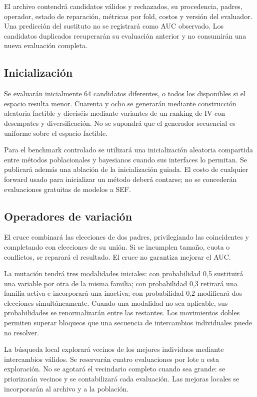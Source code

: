 \documentclass[11pt,letterpaper]{article}
\begin{document}
El archivo contendrá candidatos válidos y rechazados, su procedencia, padres, operador, estado de reparación, métricas por fold, costos y versión del evaluador. Una predicción del sustituto no se registrará como AUC observado. Los candidatos duplicados recuperarán su evaluación anterior y no consumirán una nueva evaluación completa.

\subsection{Inicialización}\label{sec:6.2}

Se evaluarán inicialmente 64 candidatos diferentes, o todos los disponibles si el espacio resulta menor. Cuarenta y ocho se generarán mediante construcción aleatoria factible y dieciséis mediante variantes de un ranking de IV con desempates y diversificación. No se supondrá que el generador secuencial es uniforme sobre el espacio factible.

Para el benchmark controlado se utilizará una inicialización aleatoria compartida entre métodos poblacionales y bayesianos cuando sus interfaces lo permitan. Se publicará además una ablación de la inicialización guiada. El costo de cualquier forward usado para inicializar un método deberá contarse; no se concederán evaluaciones gratuitas de modelos a SEF.

\subsection{Operadores de variación}\label{sec:6.3}

El cruce combinará las elecciones de dos padres, privilegiando las coincidentes y completando con elecciones de su unión. Si se incumplen tamaño, cuota o conflictos, se reparará el resultado. El cruce no garantiza mejorar el AUC.

La mutación tendrá tres modalidades iniciales: con probabilidad 0,5 sustituirá una variable por otra de la misma familia; con probabilidad 0,3 retirará una familia activa e incorporará una inactiva; con probabilidad 0,2 modificará dos elecciones simultáneamente. Cuando una modalidad no sea aplicable, sus probabilidades se renormalizarán entre las restantes. Los movimientos dobles permiten superar bloqueos que una secuencia de intercambios individuales puede no resolver.

La búsqueda local explorará vecinos de los mejores individuos mediante intercambios válidos. Se reservarán cuatro evaluaciones por lote a esta exploración. No se agotará el vecindario completo cuando sea grande: se priorizarán vecinos y se contabilizará cada evaluación. Las mejoras locales se incorporarán al archivo y a la población.
\end{document}
